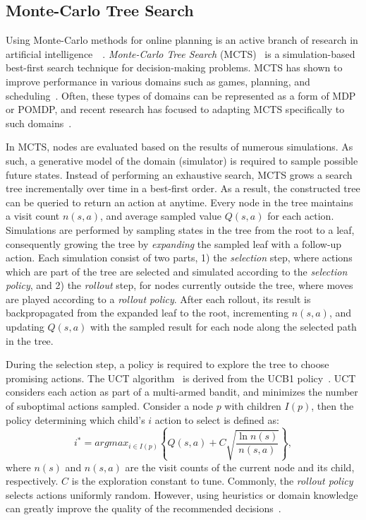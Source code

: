 \documentclass[conference]{IEEEtran}
\begin{document}
\subsection{Monte-Carlo Tree Search}
\label{sub:mcts}


Using Monte-Carlo methods for online planning is an active branch of research in artificial intelligence~\cf~\cite{browne2012survey}. {\it Monte-Carlo Tree Search} (MCTS)~\cite{coulom2007efficient,kocsis2006bandit} is a simulation-based best-first search technique for decision-making problems. MCTS has shown to improve performance in various domains such as games, planning, and scheduling~\cite{browne2012survey}. Often, these types of domains can be represented as a form of MDP or POMDP, and recent research has focused to adapting MCTS specifically to such domains~\cite{silver2010monte,Feldman12BRUE}.

In MCTS, nodes are evaluated based on the results of numerous simulations. As such, a generative model of the domain (\ie simulator) is required to sample possible future states. Instead of performing an exhaustive search, MCTS grows a search tree incrementally over time in a best-first order. As a result, the constructed tree can be queried to return an action at anytime. Every node in the tree maintains a visit count $n(s,a)$, and average sampled value $Q(s,a)$ for each action. Simulations are performed by sampling states in the tree from the root to a leaf, consequently growing the tree by \emph{expanding} the sampled leaf with a follow-up action. Each simulation consist of two parts, 1) the \emph{selection} step, where actions which are part of the tree are selected and simulated according to the {\it selection policy}, and 2) the \emph{rollout} step, for nodes currently outside the tree, where moves are played according to a \emph{rollout policy}. After each rollout, its result is backpropagated from the expanded leaf to the root, incrementing $n(s,a)$, and updating $Q(s,a)$ with the sampled result for each node along the selected path in the tree.

During the selection step, a policy is required to explore the tree to choose promising actions. The UCT algorithm~\cite{kocsis2006bandit} is derived from the UCB1 policy~\cite{auer2002using}. UCT considers each action as part of a multi-armed bandit, and minimizes the number of suboptimal actions sampled. Consider a node $p$ with children $I(p)$, then the policy determining which child's $i$ action to select is defined as:
\begin{equation}
\label{eq:uct}
i^* = argmax_{i \in I(p)}\left\{ Q(s,a) + C \sqrt{ \frac{\ln{n(s)}}{n(s, a)}}\right\},
\end{equation}
where $n(s)$ and $n(s, a)$ are the visit counts of the current node and its child, respectively. $C$ is the exploration constant to tune. Commonly, the \emph{rollout policy} selects actions uniformly random. However, using heuristics or domain knowledge can greatly improve the quality of the recommended decisions~\cite{browne2012survey}.
\end{document}
